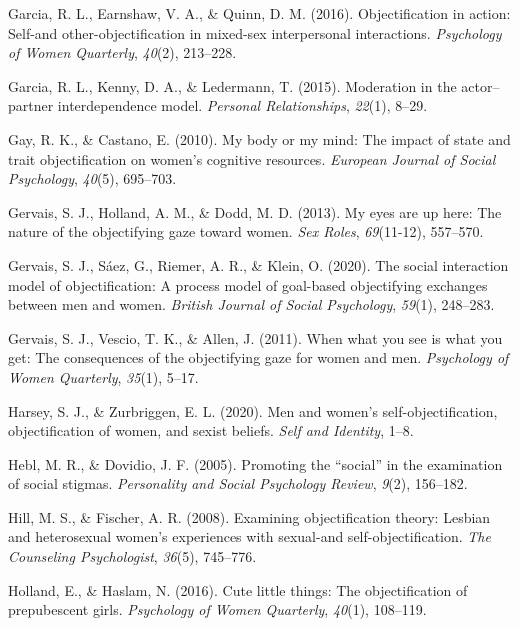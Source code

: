 \documentclass[man]{apa6}
\begin{document}
\hypertarget{ref-garcia2016objectification}{}
Garcia, R. L., Earnshaw, V. A., \& Quinn, D. M. (2016). Objectification
in action: Self-and other-objectification in mixed-sex interpersonal
interactions. \emph{Psychology of Women Quarterly}, \emph{40}(2),
213--228.

\hypertarget{ref-garcia2015moderation}{}
Garcia, R. L., Kenny, D. A., \& Ledermann, T. (2015). Moderation in the
actor--partner interdependence model. \emph{Personal Relationships},
\emph{22}(1), 8--29.

\hypertarget{ref-gay2010my}{}
Gay, R. K., \& Castano, E. (2010). My body or my mind: The impact of
state and trait objectification on women's cognitive resources.
\emph{European Journal of Social Psychology}, \emph{40}(5), 695--703.

\hypertarget{ref-gervais2013my}{}
Gervais, S. J., Holland, A. M., \& Dodd, M. D. (2013). My eyes are up
here: The nature of the objectifying gaze toward women. \emph{Sex
Roles}, \emph{69}(11-12), 557--570.

\hypertarget{ref-gervais2020social}{}
Gervais, S. J., Sáez, G., Riemer, A. R., \& Klein, O. (2020). The social
interaction model of objectification: A process model of goal-based
objectifying exchanges between men and women. \emph{British Journal of
Social Psychology}, \emph{59}(1), 248--283.

\hypertarget{ref-gervais2011you}{}
Gervais, S. J., Vescio, T. K., \& Allen, J. (2011). When what you see is
what you get: The consequences of the objectifying gaze for women and
men. \emph{Psychology of Women Quarterly}, \emph{35}(1), 5--17.

\hypertarget{ref-harsey2020men}{}
Harsey, S. J., \& Zurbriggen, E. L. (2020). Men and women's
self-objectification, objectification of women, and sexist beliefs.
\emph{Self and Identity}, 1--8.

\hypertarget{ref-hebl2005promoting}{}
Hebl, M. R., \& Dovidio, J. F. (2005). Promoting the ``social'' in the
examination of social stigmas. \emph{Personality and Social Psychology
Review}, \emph{9}(2), 156--182.

\hypertarget{ref-hill2008examining}{}
Hill, M. S., \& Fischer, A. R. (2008). Examining objectification theory:
Lesbian and heterosexual women's experiences with sexual-and
self-objectification. \emph{The Counseling Psychologist}, \emph{36}(5),
745--776.

\hypertarget{ref-holland2016}{}
Holland, E., \& Haslam, N. (2016). Cute little things: The
objectification of prepubescent girls. \emph{Psychology of Women
Quarterly}, \emph{40}(1), 108--119.
\end{document}
